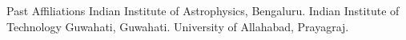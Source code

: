 \begin{rubric}{Past Affiliations}
\entry*[2021 -- 2021]%
	 Indian Institute of Astrophysics, Bengaluru.
%
\entry*[2019 -- 2021]%
	 Indian Institute of Technology Guwahati, Guwahati.
%
%
\entry*[2016 -- 2019]%
	University of Allahabad, Prayagraj.
%
\end{rubric}
